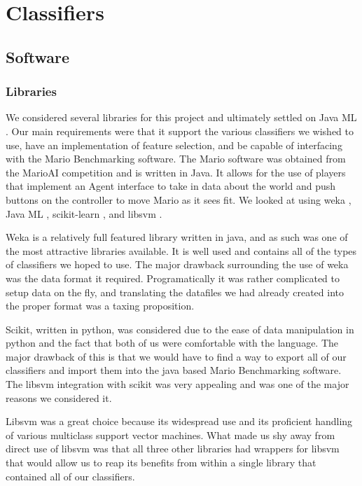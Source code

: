 \documentclass[]{article}   %
\begin{document}
\section{Classifiers}
\subsection{Software}
\subsubsection{Libraries}
We considered several libraries for this project and ultimately settled on Java ML \cite{javaml}. Our main requirements were that it support the various classifiers we wished to use, have an implementation of feature selection, and be capable of interfacing with the Mario Benchmarking \cite{mariobenchmark} software. The Mario software was obtained from the MarioAI competition and is written in Java. It allows for the use of players that implement an Agent interface to take in data about the world and push buttons on the controller to move Mario as it sees fit. We looked at using weka \cite{weka}, Java ML \cite{javaml}, scikit-learn \cite{scikit}, and libsvm \cite{libsvm}. 

Weka is a relatively full featured library written in java, and as such was one of the most attractive libraries available. It is well used and contains all of the types of classifiers we hoped to use. The major drawback surrounding the use of weka was the data format it required. Programatically it was rather complicated to setup data on the fly, and translating the datafiles we had already created into the proper format was a taxing proposition. 

Scikit, written in python, was considered due to the ease of data manipulation in python and the fact that both of us were comfortable with the language. The major drawback of this is that we would have to find a way to export all of our classifiers and import them into the java based Mario Benchmarking software. The libsvm integration with scikit was very appealing and was one of the major reasons we considered it.

Libsvm was a great choice because its widespread use and its proficient handling of various multiclass support vector machines. What made us shy away from direct use of libsvm was that all three other libraries had wrappers for libsvm that would allow us to reap its benefits from within a single library that contained all of our classifiers.
\end{document}
